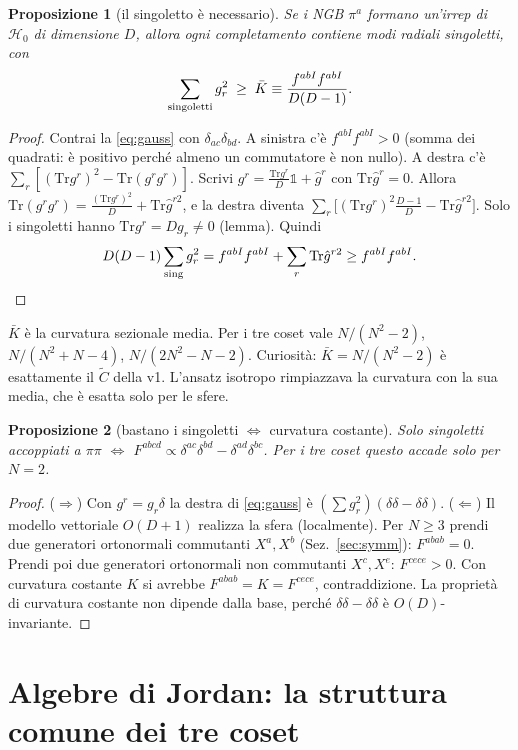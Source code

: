 \documentclass[11pt,a4paper]{article}
\numberwithin{equation}{section}
\newtheorem{prop}{Proposizione}
\theoremstyle{remark}
\newcommand{\Tr}{\mathrm{Tr}}
\newcommand{\Hg}{\mathcal{H}_0}
\newcommand{\one}{\mathbb{1}}
\begin{document}
\begin{prop}[il singoletto è necessario]
\label{prop:singlet}
Se i NGB $\pi^a$ formano un'irrep di $\Hg$ di dimensione $D$, allora ogni completamento contiene modi radiali singoletti, con
\begin{equation}
\sum_{\rm singoletti}g_r^2\;\ge\;\bar K\equiv\frac{f^{abI}f^{abI}}{D(D-1)} .
\end{equation}
\end{prop}
\begin{proof}
Contrai la \eqref{eq:gauss} con $\delta_{ac}\delta_{bd}$. A sinistra c'è $f^{abI}f^{abI}>0$ (somma dei quadrati: è positivo perché almeno un commutatore è non nullo). A destra c'è $\sum_r[(\Tr g^r)^2-\Tr(g^rg^r)]$. Scrivi $g^r=\frac{\Tr g^r}{D}\one+\hat g^r$ con $\Tr\hat g^r=0$. Allora $\Tr(g^rg^r)=\frac{(\Tr g^r)^2}{D}+\Tr\hat g^{r2}$, e la destra diventa $\sum_r\big[(\Tr g^r)^2\frac{D-1}{D}-\Tr\hat g^{r2}\big]$. Solo i singoletti hanno $\Tr g^r=Dg_r\ne0$ (lemma). Quindi
\[
D(D-1)\sum_{\rm sing}g_r^2=f^{abI}f^{abI}+\sum_r\Tr\hat g^{r2}\ge f^{abI}f^{abI}.\qedhere
\]
\end{proof}
$\bar K$ è la curvatura sezionale media. Per i tre coset vale $N/(N^2-2)$, $N/(N^2+N-4)$, $N/(2N^2-N-2)$. Curiosità: $\bar K=N/(N^2-2)$ è esattamente il $\tilde C$ della v1. L'ansatz isotropo rimpiazzava la curvatura con la sua media, che è esatta solo per le sfere.

\begin{prop}[bastano i singoletti $\iff$ curvatura costante]
\label{prop:sphere}
Solo singoletti accoppiati a $\pi\pi$ $\iff$ $F^{abcd}\propto\delta^{ac}\delta^{bd}-\delta^{ad}\delta^{bc}$. Per i tre coset questo accade solo per $N=2$.
\end{prop}
\begin{proof}
($\Rightarrow$) Con $g^r=g_r\delta$ la destra di \eqref{eq:gauss} è $(\sum g_r^2)(\delta\delta-\delta\delta)$. ($\Leftarrow$) Il modello vettoriale $O(D+1)$ realizza la sfera (localmente). Per $N\ge3$ prendi due generatori ortonormali commutanti $X^a,X^b$ (Sez.~\ref{sec:symm}): $F^{abab}=0$. Prendi poi due generatori ortonormali non commutanti $X^{c},X^{e}$: $F^{cece}>0$. Con curvatura costante $K$ si avrebbe $F^{abab}=K=F^{cece}$, contraddizione. La proprietà di curvatura costante non dipende dalla base, perché $\delta\delta-\delta\delta$ è $O(D)$-invariante.
\end{proof}

\section{Algebre di Jordan: la struttura comune dei tre coset}
\label{sec:jordan}
\end{document}
